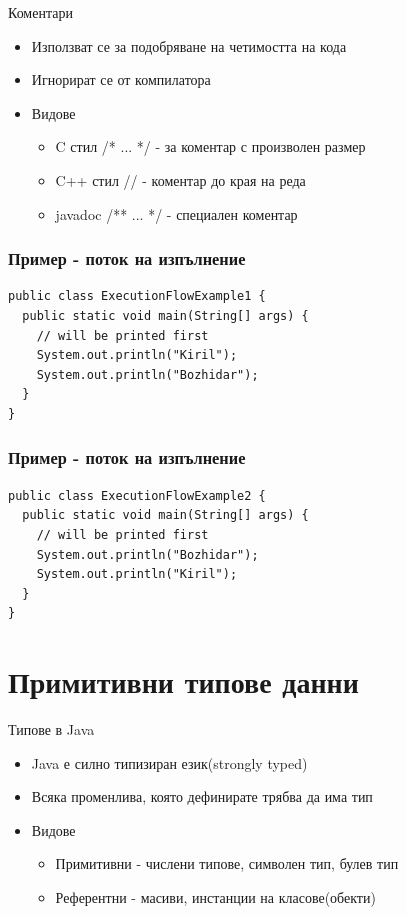 \documentclass{beamer}
\begin{document}
\begin{frame}{Коментари}
  \transdissolve  
  \begin{itemize}
    \item Използват се за подобряване на четимостта на кода
    \item Игнорират се от компилатора
    \item Видове
      \begin{itemize}
        \item C стил /* ... */ - за коментар с произволен размер
        \item C++ стил // - коментар до края на реда
        \item javadoc /** ... */ - специален коментар
      \end{itemize}
  \end{itemize}
\end{frame}

\begin{frame}[fragile]
  \frametitle{Пример - поток на изпълнение}
  \transdissolve
  \begin{lstlisting}
public class ExecutionFlowExample1 {
  public static void main(String[] args) {
    // will be printed first
    System.out.println("Kiril");
    System.out.println("Bozhidar");
  }
}
  \end{lstlisting}
\end{frame}

\begin{frame}[fragile]
  \frametitle{Пример - поток на изпълнение}
  \transdissolve
  \begin{lstlisting}
public class ExecutionFlowExample2 {
  public static void main(String[] args) {
    // will be printed first
    System.out.println("Bozhidar");
    System.out.println("Kiril");
  }
}
  \end{lstlisting}
\end{frame}

\section{Примитивни типове данни}


\begin{frame}{Типове в Java}
  
  \begin{itemize}
  \item Java е силно типизиран език(strongly typed)
  \item Всяка променлива, която дефинирате трябва да има тип
  \item Видове
    \begin{itemize}
      \item Примитивни - числени типове, символен тип, булев тип
      \item Референтни - масиви, инстанции на класове(обекти)
    \end{itemize}
  \end{itemize}
\end{frame}
\end{document}

